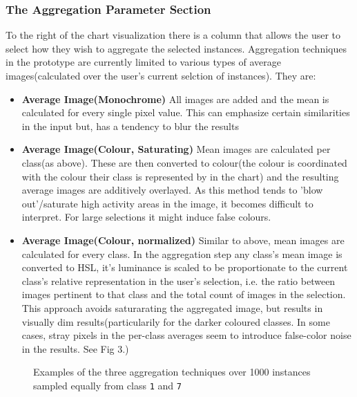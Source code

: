 \documentclass[11pt,a4paper]{article}
\begin{document}
      \subsubsection*{The Aggregation Parameter Section}
        To the right of the chart visualization there is a column that allows the user to select how they wish to aggregate the selected instances. Aggregation techniques in the prototype are currently limited to various types of average images(calculated over the user's current selction of instances). They are:\begin{itemize}
            \item \textbf{Average Image(Monochrome)} All images are added and the mean is calculated for every single pixel value. This can emphasize certain similarities in the input but, has a tendency to blur the results
            \item \textbf{Average Image(Colour, Saturating)} Mean images are calculated per class(as above). These are then converted to colour(the colour is coordinated with the colour their class is represented by in the chart) and the resulting average images are additively overlayed. As this method tends to 'blow out'/saturate high activity areas in the image, it becomes difficult to interpret. For large selections it might induce false colours.
            \item \textbf{Average Image(Colour, normalized)} Similar to above, mean images are calculated for every class. In the aggregation step any class's mean image is converted to HSL, it's luminance is scaled to be proportionate to the current class's relative representation in the user's selection, i.e. the ratio between images pertinent to that class and the total count of images in the selection. This approach avoids saturarating the aggregated image, but results in visually dim results(particularily  for the darker coloured classes. In some cases, stray pixels in the per-class averages seem to introduce false-color noise in the results. See Fig 3.)   
        \end{itemize}
        \begin{figure}
            \label{aggregation_techniques}
            \caption{Examples of the three aggregation techniques over 1000 instances sampled equally from class \texttt{1} and \texttt{7}}
        \end{figure}
\end{document}
